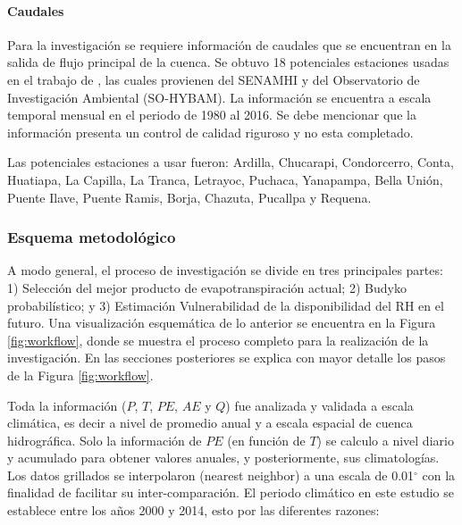\documentclass[12pt]{article}
\begin{document}


\paragraph{Caudales}\mbox{}

Para la investigación se requiere información de caudales que se encuentran en la salida de flujo principal de la cuenca. Se obtuvo 18 potenciales estaciones usadas en el trabajo de \citet{Aybar2019}, las cuales provienen del SENAMHI y del Observatorio de Investigación Ambiental (SO-HYBAM). La información se encuentra a escala temporal mensual en el periodo de 1980 al 2016. Se debe mencionar que la información presenta un control de calidad riguroso y no esta completado.

Las potenciales estaciones a usar fueron: Ardilla, Chucarapi, Condorcerro, Conta, Huatiapa, La Capilla, La Tranca, Letrayoc, Puchaca, Yanapampa, Bella Unión, Puente Ilave, Puente Ramis, Borja, Chazuta, Pucallpa y Requena.

\subsubsection{Esquema metodológico}

A modo general, el proceso de investigación se divide en tres principales partes: 1) Selección del mejor producto de evapotranspiración actual; 2) Budyko probabilístico; y 3) Estimación Vulnerabilidad de la disponibilidad del RH en el futuro. Una visualización esquemática de lo anterior se encuentra en la Figura \ref{fig:workflow}, donde se muestra el proceso completo para la realización de la investigación. En las secciones posteriores se explica con mayor detalle los pasos de la Figura \ref{fig:workflow}.



Toda la información ($P$, $T$, $PE$, $AE$ y $Q$) fue analizada y validada a escala climática, es decir a nivel de promedio anual y a escala espacial de cuenca hidrográfica. Solo la información de $PE$ (en función de $T$) se calculo a nivel diario y acumulado para obtener valores anuales, y posteriormente, sus climatologías. Los datos grillados se interpolaron (nearest neighbor) a una escala de 0.01$^{\circ}$ con la finalidad de facilitar su inter-comparación. El periodo climático en este estudio se establece entre los años 2000 y 2014, esto por las diferentes razones:
\end{document}
